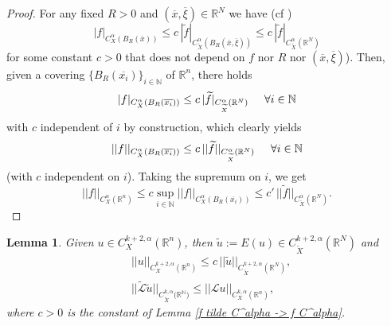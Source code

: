 \documentclass{article}
\newtheorem{lemma}[theorem]{Lemma}
\numberwithin{equation}{section}
\begin{document}
\vspace{2mm}

\begin{proof}
    For any fixed $R>0$ and $(\overline{x}, \overline{\xi}) \in \mathbb{R}^N$ we have (cf \cite[Proposition 8.3]{Hölder spaces: original vs lifted})
    \begin{equation*}
        |f|_{C^{\alpha}_X(B_R(\overline{x}))} \leq c \, |\widetilde{f}|_{C^{\alpha}_{\widetilde{X}}(B_R(\overline{x}, \overline{\xi}))} \leq c \, |\widetilde{f}|_{C^{\alpha}_{\widetilde{X}}(\mathbb{R}^N)}
    \end{equation*}
    for some constant $c>0$ that does not depend on $f$ nor $R$ nor $(\overline{x}, \overline{\xi})$). Then, given a covering $\{B_R(\overline{x_i})\}_{i \in \mathbb{N}}$ of $\mathbb{R}^n$, there holds
    \begin{equation*}
        |f|_{C^{\alpha}_X(B_R(\overline{x_i}))} \leq c \, |\widetilde{f}|_{C^{\alpha}_{\widetilde{X}}(\mathbb{R}^N)} \hspace{5mm} \forall i \in \mathbb{N}
    \end{equation*}
    with $c$ independent of $i$ by construction, which clearly yields
    \begin{equation*}
        ||f||_{C^{\alpha}_X(B_R(\overline{x_i}))} \leq c \, ||\widetilde{f}||_{C^{\alpha}_{\widetilde{X}}(\mathbb{R}^N)} \hspace{5mm} \forall i \in \mathbb{N}
    \end{equation*}
    (with $c$ independent on $i$). Taking the supremum on $i$, we get
    \begin{equation*}
        ||f||_{C^{\alpha}_X(\mathbb{R}^n)} \leq c \sup_{i \in \mathbb{N}} ||f||_{C^{\alpha}_X(B_R(\overline{x_i}))} \leq c' \, ||\widetilde{f}||_{C^{\alpha}_{\widetilde{X}}(\mathbb{R}^N)}.
    \end{equation*}
\end{proof}

\vspace{2mm}

\begin{lemma}
\label{lemma 5.3 final}
    Given $u \in C^{k+2,\alpha}_X(\mathbb{R}^n)$, then $\widetilde{u}:=E(u) \in C^{k+2,\alpha}_{\widetilde{X}}(\mathbb{R}^N)$ and
    \begin{align}
        & \label{||u||_2,alpha <= c||f tilde||2,alpha} ||u||_{C^{k+2,\alpha}_X(\mathbb{R}^n)} \leq c \, ||\widetilde{u}||_{C^{k+2,\alpha}_{\widetilde{X}}(\mathbb{R}^N)},
        \\
        & \label{||Lu tilde|| <= ||Lu||}||\mathcal{\widetilde{L}} \widetilde{u}||_{C^{k,\alpha}_{\widetilde{X}}(\mathbb{R^N)}} \leq ||\mathcal{L} u||_{C^{k,\alpha}_X(\mathbb{R}^n)},
    \end{align}
    where $c>0$ is the constant of Lemma \ref{f tilde C^alpha -> f C^alpha}.
\end{lemma}
\end{document}

